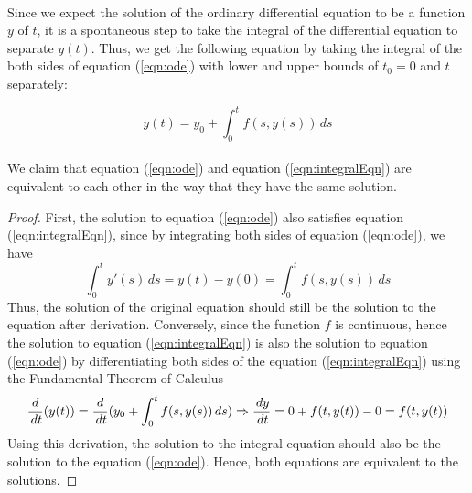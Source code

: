 \documentclass{article}
\theoremstyle{definition}
\theoremstyle{remark}
\theoremstyle{example}
\begin{document}
\paragraph{  }

Since we expect the solution of the ordinary differential equation to be a function $y$ of $t$, it is a spontaneous step to take the integral of the differential equation to separate $y(t)$. Thus, we get the following equation by taking the integral of the both sides of equation (\ref{eqn:ode}) with lower and upper bounds of $t_0 = 0$ and $t$ separately:

\begin{equation}\label{eqn:integralEqn}
    y(t) = y_0 + \int_{0}^{t} f(s,y(s))\,ds
\end{equation}

\paragraph{  }

We claim that equation (\ref{eqn:ode}) and equation (\ref{eqn:integralEqn}) are equivalent to each other in the way that they have the same solution. 

\begin{proof}
    First, the solution to equation (\ref{eqn:ode}) also satisfies equation (\ref{eqn:integralEqn}), since by integrating both sides of equation (\ref{eqn:ode}), we have 
    \begin{equation}
        \int_{0}^{t}y'(s)\,ds = y(t) - y(0) = \int_{0}^{t} f(s,y(s)) \,ds
    \end{equation}
    Thus, the solution of the original equation should still be the solution to the equation after derivation.
    Conversely, since the function $f$ is continuous, hence the solution to equation (\ref{eqn:integralEqn}) is also the solution to equation (\ref{eqn:ode}) by differentiating both sides of the equation (\ref{eqn:integralEqn}) using the Fundamental Theorem of Calculus
    \begin{equation}\label{eqn:successive}
        \dfrac{d}{\,dt}{(y(t))} = \dfrac{d}{\,dt}{(y_0 + \int_{0}^{t}{f(s,y(s))\,ds})}\\
        \Rightarrow \dfrac{\,dy}{\,dt} = 0 + f(t,y(t)) - 0 = f(t,y(t))
    \end{equation}
    Using this derivation, the solution to the integral equation should also be the solution to the equation (\ref{eqn:ode}). Hence, both equations are equivalent to the solutions.
\end{proof}
\end{document}
